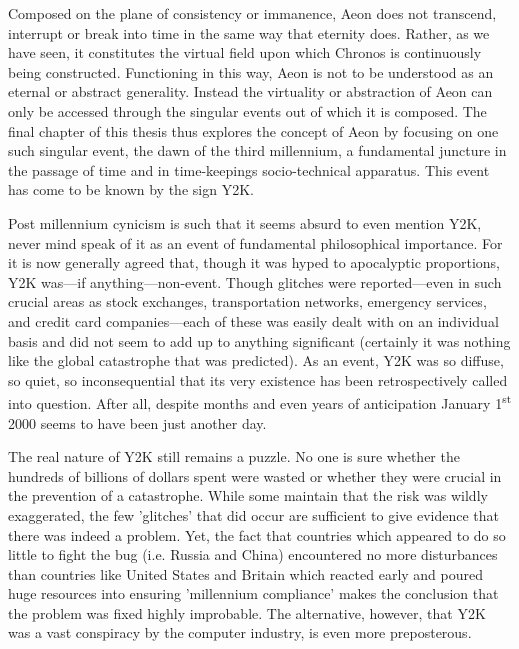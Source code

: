 Composed on the plane of consistency or immanence, Aeon does not transcend, interrupt or break into time in the same way that eternity does. Rather, as we have seen, it constitutes the virtual field upon which Chronos is continuously being constructed. Functioning in this way, Aeon is not to be understood as an eternal or abstract generality. Instead the virtuality or abstraction of Aeon can only be accessed through the singular events out of which it is composed. The final chapter of this thesis thus explores the concept of Aeon by focusing on one such singular event, the dawn of the third millennium, a fundamental juncture in the passage of time and in time-keepings socio-technical apparatus. This event has come to be known by the sign Y2K.

Post millennium cynicism is such that it seems absurd to even mention Y2K, never mind speak of it as an event of fundamental philosophical importance. For it is now generally agreed that, though it was hyped to apocalyptic proportions, Y2K was---if anything---non-event. Though glitches were reported---even in such crucial areas as stock exchanges, transportation networks, emergency services, and credit card companies---each of these was easily dealt with on an individual basis and did not seem to add up to anything significant (certainly it was nothing like the global catastrophe that was predicted). As an event, Y2K was so diffuse, so quiet, so inconsequential that its very existence has been retrospectively called into question. After all, despite months and even years of anticipation January 1\textsuperscript{st} 2000 seems to have been just another day.

The real nature of Y2K still remains a puzzle. No one is sure whether the hundreds of billions of dollars spent were wasted or whether they were crucial in the prevention of a catastrophe. While some maintain that the risk was wildly exaggerated, the few 'glitches' that did occur are sufficient to give evidence that there was indeed a problem. Yet, the fact that countries which appeared to do so little to fight the bug (i.e. Russia and China) encountered no more disturbances than countries like United States and Britain which reacted early and poured huge resources into ensuring 'millennium compliance' makes the conclusion that the problem was fixed highly improbable. The alternative, however, that Y2K was a vast conspiracy by the computer industry, is even more preposterous.


